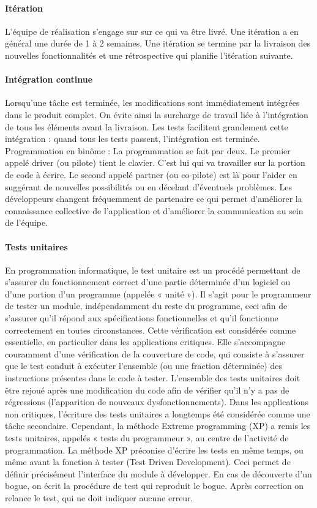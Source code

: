 \documentclass[12pt,oneside]{book}
\begin{document}
\paragraph{Itération}
L'équipe de réalisation s'engage sur sur ce qui va être livré. Une itération a en général une durée de 1 à 2 semaines. Une itération se termine par la livraison des nouvelles fonctionnalités et une rétrospective qui planifie l'itération suivante.

\paragraph{Intégration continue}
Lorsqu'une t\^ache est terminée, les modifications sont immédiatement intégrées dans le produit complet. On évite ainsi la surcharge de travail liée à l'intégration de tous les éléments avant la livraison. Les tests facilitent grandement cette intégration : quand tous les tests passent, l'intégration est terminée. 
Programmation en bin\^ome : La programmation se fait par deux. Le premier appelé driver (ou pilote) tient le clavier. C'est lui qui va travailler sur la portion de code à écrire. Le second appelé partner (ou co-pilote) est là pour l'aider en suggérant de nouvelles possibilités ou en décelant d'éventuels problèmes. Les développeurs changent fréquemment de partenaire ce qui permet d'améliorer la connaissance collective de l'application et d'améliorer la communication au sein de l'équipe. 

\paragraph{Tests unitaires}
En programmation informatique, le test unitaire est un procédé permettant de s'assurer du fonctionnement correct d'une partie déterminée d'un logiciel ou d'une portion d'un programme (appelée « unité »).
Il s'agit pour le programmeur de tester un module, indépendamment du reste du programme, ceci afin de s'assurer qu'il répond aux spécifications fonctionnelles et qu'il fonctionne correctement en toutes circonstances. Cette vérification est considérée comme essentielle, en particulier dans les applications critiques. Elle s'accompagne couramment d'une vérification de la couverture de code, qui consiste à s'assurer que le test conduit à exécuter l'ensemble (ou une fraction déterminée) des instructions présentes dans le code à tester.
L'ensemble des tests unitaires doit être rejoué après une modification du code afin de vérifier qu'il n'y a pas de régressions (l'apparition de nouveaux dysfonctionnements).
Dans les applications non critiques, l'écriture des tests unitaires a longtemps été considérée comme une t\^ache secondaire. Cependant, la méthode Extreme programming (XP) a remis les tests unitaires, appelés « tests du programmeur », au centre de l'activité de programmation.
La méthode XP préconise d'écrire les tests en même temps, ou même avant la fonction à tester (Test Driven Development). Ceci permet de définir précisément l'interface du module à développer. En cas de découverte d'un bogue, on écrit la procédure de test qui reproduit le bogue. Après correction on relance le test, qui ne doit indiquer aucune erreur.
\end{document}
